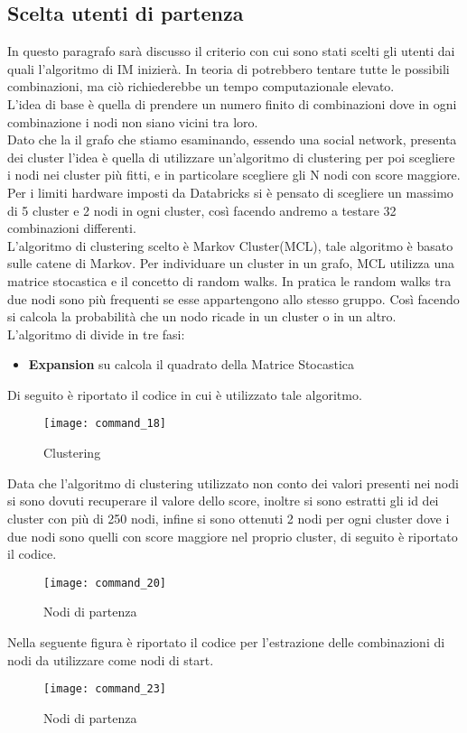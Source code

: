 \subsection{Scelta utenti di partenza}
In questo paragrafo sarà discusso il criterio con cui sono stati scelti gli utenti
dai quali l'algoritmo di IM inizierà. In teoria di potrebbero tentare tutte le
possibili combinazioni, ma ciò richiederebbe un tempo computazionale elevato.\\
L'idea di base è quella di prendere un numero finito di combinazioni dove in ogni
combinazione i nodi non siano vicini tra loro. \\
Dato che la il grafo che stiamo esaminando, essendo una social network,
presenta dei cluster l'idea è quella di utilizzare un'algoritmo
di clustering per poi scegliere i nodi nei cluster più fitti, e in particolare scegliere gli
N nodi con score maggiore. Per i limiti hardware imposti da Databricks si è pensato di
scegliere un massimo di 5 cluster e 2 nodi in ogni cluster, così facendo andremo a testare
32 combinazioni differenti.\\
L'algoritmo di clustering scelto è Markov Cluster(MCL), tale algoritmo è basato sulle
catene di Markov. Per individuare un cluster in un grafo, MCL utilizza una matrice stocastica
e il concetto di random walks. In pratica le random walks tra due nodi sono più frequenti se esse appartengono
allo stesso gruppo. Così facendo si calcola la probabilità che un nodo ricade in
un cluster o in un altro.\\
L'algoritmo di divide in tre fasi:
\begin{itemize}
  \item \textbf{Expansion} su calcola il quadrato della Matrice Stocastica
\end{itemize}
Di seguito è riportato il codice in cui è utilizzato tale algoritmo.
\begin{figure}[!htbp]
  \texttt{[image: command\_18]}
  \caption{Clustering}
  \label{command_18}
\end{figure}
\clearpage
Data che l'algoritmo di clustering utilizzato non conto dei valori presenti nei
nodi si sono dovuti recuperare il valore dello score, inoltre si sono estratti gli
id dei cluster con più di 250 nodi, infine si sono ottenuti 2 nodi per ogni cluster
dove i due nodi sono quelli con score maggiore nel proprio cluster, di seguito è riportato il codice.
\begin{figure}[!htbp]
  \texttt{[image: command\_20]}
  \caption{Nodi di partenza}
  \label{command_20}
\end{figure}
Nella seguente figura è riportato il codice per l'estrazione delle combinazioni di
nodi da utilizzare come nodi di start.
\begin{figure}[!htbp]
  \texttt{[image: command\_23]}
  \caption{Nodi di partenza}
  \label{command_23}
\end{figure}
\clearpage

